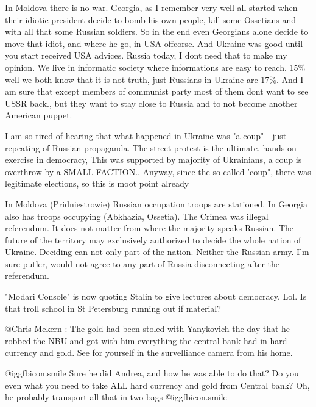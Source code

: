 \begin{itemize}
\begin{itemize}
In Moldova there is no war. Georgia, as I remember very well all started when
their idiotic president decide to bomb his own people, kill some Ossetians and
with all that some Russian soldiers. So in the end even Georgians alone decide
to move that idiot, and where he go, in USA offcorse. And Ukraine was good
until you start received USA advices. Russia today, I dont need that to make my
opinion. We live in informatic society where informations are easy to reach.
15\% well we both know that it is not truth, just Russians in Ukraine are 17\%.
And I am sure that except members of communist party most of them dont want to
see USSR back., but they want to stay close to Russia and to not become another
American puppet.



I am so tired of hearing that what happened in Ukraine was "a coup" - just
repeating of Russian propaganda. The street protest is the ultimate, hands on
exercise in democracy, This was supported by majority of Ukrainians, a coup is
overthrow by a SMALL FACTION.. Anyway, since the so called 'coup", there was
legitimate elections, so this is moot point already


In Moldova (Pridniestrowie) Russian occupation troops are stationed. In Georgia
also has troops occupying (Abkhazia, Ossetia). The Crimea was illegal
referendum. It does not matter from where the majority speaks Russian. The
future of the territory may exclusively authorized to decide the whole nation
of Ukraine. Deciding can not only part of the nation. Neither the Russian army.
I'm sure putler, would not agree to any part of Russia disconnecting after the
referendum.



"Modari Console" is now quoting Stalin to give lectures about democracy. Lol.
Is that troll school in St Petersburg running out if material?


@Chris Mekern : The gold had been stoled with Yanykovich the day that he robbed
the NBU and got with him everything the central bank had in hard currency and
gold. See for yourself in the survelliance camera from his home.


 @igg{fbicon.smile}  Sure he did Andrea, and how he was able to do that? Do you even what you
need to take ALL hard currency and gold from Central bank? Oh, he probably
transport all that in two bags  @igg{fbicon.smile} 


\end{itemize}
\end{itemize}

